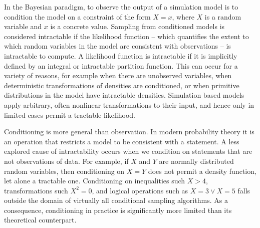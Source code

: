 In the Bayesian paradigm, to observe the output of a simulation model is to condition the model on a constraint of the form $X = x$, where $X$ is a random variable and $x$ is a concrete value.
Sampling from conditioned models is considered intractable if the likelihood function --  which quantifies the extent to which random variables in the model are consistent with observations -- is intractable to compute.
A likelihood function is intractable if it is implicitly defined by an integral or intractable partition function.
This can occur for a variety of reasons, for example when there are unobserved variables, when deterministic transformations of densities are conditioned, or when primitive distributions in the model have intractable densities.
Simulation based models apply arbitrary, often nonlinear transformations to their input, and hence only in limited cases permit a tractable likelihood.

Conditioning is more general than observation.
In modern probability theory it is an operation that restricts a model to be consistent with a statement.
A less explored cause of intractability occurs when we condition on statements that are not observations of data.
For example, if $X$ and $Y$ are normally distributed random variables, then conditioning on $X = Y$ does not permit a density function, let alone a tractable one.
Conditioning on inequalities such $X > 4$, transformations such $X^2  = 0$, and logical operations such as  $X = 3 \lor X = 5$ falls outside the domain of virtually all conditional sampling algorithms.
As a consequence, conditioning in practice is significantly more limited than its theoretical counterpart.



